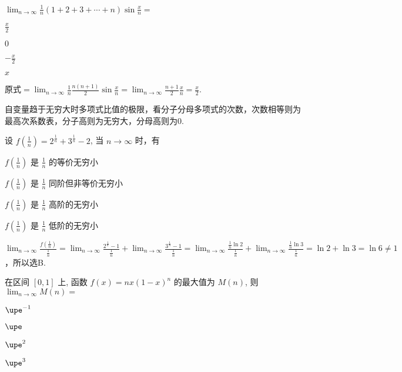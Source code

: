 \documentclass{USTBExam}
\begin{document}
\begin{problem}
  $\lim _{n \to \infty} \frac{1}{n}\left( 1+2+3+\cdots+n \right) \sin \frac{x}{n}=$
  \paren[A]
  \begin{choices}
    \item $\frac{x}{2}$
    \item $0$
    \item $-\frac{x}{2}$
    \item $x$
  \end{choices}
\end{problem}

\begin{analysis}
  原式$=\lim _{n \to \infty} \frac{1}{n} \frac{n(n+1)}{2} \sin \frac{x}{n} = \lim _{n \to \infty} \frac{n+1}{2} \frac{x}{n} = \frac{x}{2}$.

  \faMortarBoard 自变量趋于无穷大时多项式比值的极限，看分子分母多项式的次数，次数相等则为最高次系数表，分子高则为无穷大，分母高则为0.
\end{analysis}

\begin{problem}
  设 $f\left(\tfrac{1}{n}\right)=2^{\frac{1}{n}}+3^{\frac{1}{n}}-2$, 当 $n \to \infty$ 时，有
  \paren[B]
  \begin{choices}
    \item $f\left(\tfrac{1}{n}\right)$ 是 $\tfrac{1}{n}$ 的等价无穷小
    \item $f\left(\tfrac{1}{n}\right)$ 是 $\tfrac{1}{n}$ 同阶但非等价无穷小
    \item $f\left(\tfrac{1}{n}\right)$ 是 $\tfrac{1}{n}$ 高阶的无穷小
    \item $f\left(\tfrac{1}{n}\right)$ 是 $\tfrac{1}{n}$ 低阶的无穷小
  \end{choices}
\end{problem}

\begin{analysis}
  $\lim _{n \to \infty} \frac{f(\frac{1}{n})}{\frac{1}{n}} = \lim _{n \to \infty} \frac{2^{\frac{1}{n}}-1}{\frac{1}{n}} + \lim _{n \to \infty} \frac{3^{\frac{1}{n}}-1}{\frac{1}{n}} = \lim _{n \to \infty} \frac{\frac{1}{n} \ln2}{\frac{1}{n}} + \lim _{n \to \infty} \frac{\frac{1}{n}\ln 3}{\frac{1}{n}} = \ln2+\ln3 = \ln 6 \ne 1$，所以选B.
\end{analysis}

\begin{problem}
  在区间 $[0, 1]$ 上, 函数 $f(x)=n x(1-x)^{n}$ 的最大值为 $M(n)$, 则 $\lim _{n \to \infty} M(n)=$

  \paren[A]
  \begin{choices}
    \item $\upe^{-1}$
    \item $\upe$
    \item $\upe^{2}$
    \item $\upe^{3}$
  \end{choices}
\end{problem}
\end{document}
